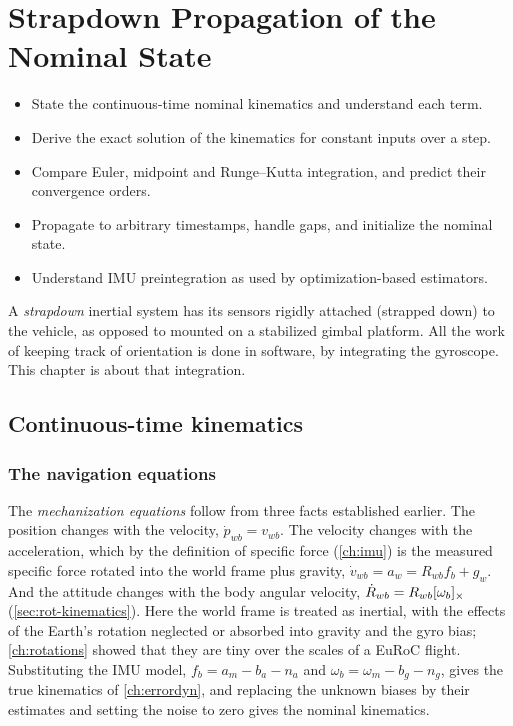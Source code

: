 \chapter{Strapdown Propagation of the Nominal State}
\label{ch:strapdown}

\begin{objectives}
\begin{itemize}
  \item State the continuous-time nominal kinematics and understand each term.
  \item Derive the exact solution of the kinematics for constant inputs over a step.
  \item Compare Euler, midpoint and Runge--Kutta integration, and predict their convergence orders.
  \item Propagate to arbitrary timestamps, handle gaps, and initialize the nominal state.
  \item Understand IMU preintegration as used by optimization-based estimators.
\end{itemize}
\end{objectives}

A \emph{strapdown} inertial system has its sensors rigidly attached (strapped down) to the vehicle, as
opposed to mounted on a stabilized gimbal platform. All the work of keeping track of orientation is done in
software, by integrating the gyroscope. This chapter is about that integration.

\section{Continuous-time kinematics}

\subsection{The navigation equations}

The \emph{mechanization equations} follow from three facts established earlier. The position changes with the velocity, $\dot p_{wb} = v_{wb}$. The
velocity changes with the acceleration, which by the definition of specific force (\cref{ch:imu}) is the measured specific force rotated into the world
frame plus gravity, $\dot v_{wb} = a_w = R_{wb}f_b + g_w$. And the attitude changes with the body angular velocity, $\dot R_{wb} = R_{wb}[\omega_b]_{\times}$
(\cref{sec:rot-kinematics}). Here the world frame is treated as inertial, with the effects of the Earth's rotation neglected or absorbed into gravity
and the gyro bias; \cref{ch:rotations} showed that they are tiny over the scales of a EuRoC flight. Substituting the IMU model,
$f_b = a_m - b_a - n_a$ and $\omega_b = \omega_m - b_g - n_g$, gives the true kinematics of \cref{ch:errordyn}, and replacing the unknown biases by their estimates and
setting the noise to zero gives the nominal kinematics.

